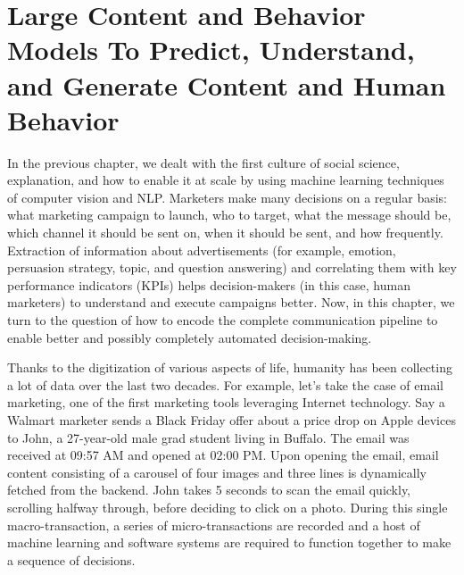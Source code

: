\newcommand{\companyName}{in-house~}

\chapter{Large Content and Behavior Models To Predict, Understand, and Generate Content and Human Behavior}
\label{chatper:Content and Behavior Models}

In the previous chapter, we dealt with the first culture of social science, explanation, and how to enable it at scale by using machine learning techniques of computer vision and NLP. Marketers make many decisions on a regular basis: what marketing campaign to launch, who to target, what the message should be, which channel it should be sent on, when it should be sent, and how frequently. Extraction of information about advertisements (for example, emotion, persuasion strategy, topic, and question answering) and correlating them with key performance indicators (KPIs) helps decision-makers (in this case, human marketers) to understand and execute campaigns better. Now, in this chapter, we turn to the question of how to encode the complete communication pipeline to enable better and possibly completely automated decision-making. 


Thanks to the digitization of various aspects of life, humanity has been collecting a lot of data over the last two decades. For example, let's take the case of email marketing, one of the first marketing tools leveraging Internet technology. Say a Walmart marketer sends a Black Friday offer about a price drop on Apple devices to John, a 27-year-old male grad student living in Buffalo. The email was received at 09:57 AM and opened at 02:00 PM. Upon opening the email, email content consisting of a carousel of four images and three lines is dynamically fetched from the backend. John takes 5 seconds to scan the email quickly, scrolling halfway through, before deciding to click on a photo. During this single macro-transaction, a series of micro-transactions are recorded and a host of machine learning and software systems are required to function together to make a sequence of decisions. 

